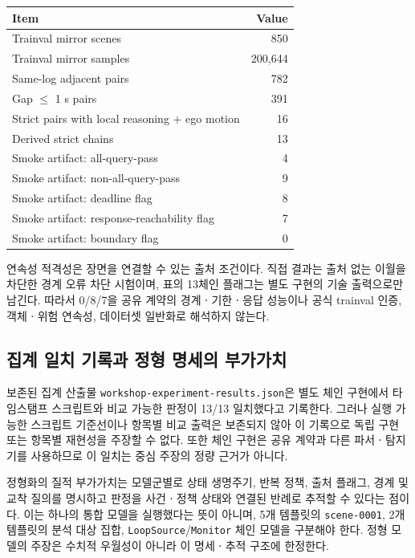\begin{table}[t]
\centering
{}
\label{tab:scene-continuity-results}
\footnotesize
\begin{tabular}{lr}
\toprule
Item & Value \\
\midrule
Trainval mirror scenes & 850 \\
Trainval mirror samples & 200,644 \\
Same-log adjacent pairs & 782 \\
Gap $\leq$ 1 s pairs & 391 \\
Strict pairs with local reasoning + ego motion & 16 \\
Derived strict chains & 13 \\
Smoke artifact: all-query-pass & 4 \\
Smoke artifact: non-all-query-pass & 9 \\
Smoke artifact: deadline flag & 8 \\
Smoke artifact: response-reachability flag & 7 \\
Smoke artifact: boundary flag & 0 \\
\bottomrule
\end{tabular}
\end{table}

연속성 적격성은 장면을 연결할 수 있는 출처 조건이다. 직접 결과는 출처 없는 이월을 차단한 경계 오류 차단 시험이며, 표의 13체인 플래그는 별도 구현의 기술 출력으로만 남긴다. 따라서 0/8/7을 공유 계약의 경계ㆍ기한ㆍ응답 성능이나 공식 trainval 인증, 객체ㆍ위험 연속성, 데이터셋 일반화로 해석하지 않는다.

\subsection{집계 일치 기록과 정형 명세의 부가가치}
\label{sec:results-rq4}

보존된 집계 산출물 \texttt{workshop-experiment-results.json}은 별도 체인 구현에서 타임스탬프 스크립트와  비교 가능한 판정이 13/13 일치했다고 기록한다. 그러나 실행 가능한 스크립트 기준선이나 항목별 비교 출력은 보존되지 않아 이 기록으로 독립 구현 또는 항목별 재현성을 주장할 수 없다. 또한 체인 구현은 공유 계약과 다른 파서ㆍ탐지기를 사용하므로 이 일치는 중심 주장의 정량 근거가 아니다.

정형화의 질적 부가가치는 모델군별로 상태 생명주기, 반복 정책, 출처 플래그, 경계 및 교착 질의를 명시하고 판정을 사건ㆍ정책 상태와 연결된 반례로 추적할 수 있다는 점이다. 이는 하나의 통합 모델을 실행했다는 뜻이 아니며, 5개 템플릿의 \texttt{scene-0001}, 2개 템플릿의 분석 대상 집합, \texttt{LoopSource}/\texttt{Monitor} 체인 모델을 구분해야 한다. 정형 모델의 주장은 수치적 우월성이 아니라 이 명세ㆍ추적 구조에 한정한다.

